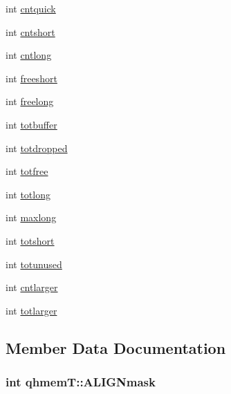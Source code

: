 \begin{DoxyCompactItemize}
$$int \hyperlink{structqhmemT_aa4be7f40ba2218c787a4b9e07c8ba0a7}{cntquick}
\item 
int \hyperlink{structqhmemT_aa854a438d957d8b7f072f6c81b8ce756}{cntshort}
\item 
int \hyperlink{structqhmemT_a40c003c14c3ba3cf59e84243420dd156}{cntlong}
\item 
int \hyperlink{structqhmemT_a41508712ddaedc818e53c63533c58e95}{freeshort}
\item 
int \hyperlink{structqhmemT_adc17a8a9961ffc35eb490a9945139fd1}{freelong}
\item 
int \hyperlink{structqhmemT_a84894175416d5b9e7ad66b4446228ddc}{totbuffer}
\item 
int \hyperlink{structqhmemT_a2fdac27b739ff8be65c016a2f1e42aec}{totdropped}
\item 
int \hyperlink{structqhmemT_ae05fdb078d7b284ec0a2f66b55bb7079}{totfree}
\item 
int \hyperlink{structqhmemT_a097b5568566b48c758696f687354fe12}{totlong}
\item 
int \hyperlink{structqhmemT_a53c4bbea16c4dacb298da3cd868b731f}{maxlong}
\item 
int \hyperlink{structqhmemT_a74d8c7d5fd8ae4260d3c16ebef3f244f}{totshort}
\item 
int \hyperlink{structqhmemT_aed75384a5dd4e977cc47751f5353b3a9}{totunused}
\item 
int \hyperlink{structqhmemT_abc8ab4f394b862a35771d7fb2e6af257}{cntlarger}
\item 
int \hyperlink{structqhmemT_a68bb78557734b8372001fd156f0d0e3f}{totlarger}
\end{DoxyCompactItemize}


\subsection{Member Data Documentation}
\hypertarget{structqhmemT_a05b3e3e76465ea220b7c2c576ea4ddb8}{}
\subsubsection[{A\+L\+I\+G\+Nmask}]{\setlength{\rightskip}{0pt plus 5cm}int qhmem\+T\+::\+A\+L\+I\+G\+Nmask}\label{structqhmemT_a05b3e3e76465ea220b7c2c576ea4ddb8}
\hypertarget{structqhmemT_ac9d8323f69d9391c58e0c069f29c087f}{}
